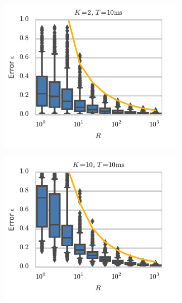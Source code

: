 \begin{figure}[t!]
\begin{subfigure}[b]{2.75in}
 \end{subfigure}
 \\
 \vspace{-.25in}
 \begin{subfigure}[b]{2.75in}
   \centering
   \includegraphics[width=\textwidth]{figures/ch7/error_vs_R_K2}
   \label{fig:error_vs_R_K2}
 \end{subfigure}
 \begin{subfigure}[b]{2.75in}
   \centering
   \includegraphics[width=\textwidth]{figures/ch7/error_vs_R_K10}
   \label{fig:error_vs_R_K10}

\end{subfigure}
\end{figure}

